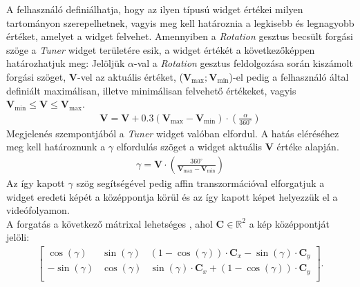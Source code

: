 A felhasználó definiálhatja, hogy az ilyen típusú widget értékei milyen tartományon szerepelhetnek, vagyis meg kell határoznia a legkisebb és legnagyobb értéket, amelyet a widget felvehet. Amennyiben a \textit{Rotation} gesztus becsült forgási szöge a \textit{Tuner} widget területére esik, a widget értékét a következőképpen határozhatjuk meg:
Jelöljük $\alpha$-val a \textit{Rotation} gesztus feldolgozása során kiszámolt forgási szöget, $\boldsymbol V$-vel az aktuális értéket, ($\boldsymbol V_{\max}; \boldsymbol V_{\min}$)-el pedig a felhasználó által definiált maximálisan, illetve minimálisan felvehető értékeket, vagyis $\boldsymbol V_{\min} \leq \boldsymbol V \leq \boldsymbol V_{\max}$.
\begin{align*}
	\boldsymbol V = \boldsymbol V + 0.3\left(\boldsymbol V_{\max} - \boldsymbol V_{\min}\right) \cdot \left( \frac{\alpha}{360^\circ}\right)
\end{align*}
Megjelenés szempontjából a \textit{Tuner} widget valóban elfordul. A hatás eléréséhez meg kell határoznunk a $\gamma$ elfordulás szöget a widget aktuális $\boldsymbol V$ értéke alapján.
\begin{align*}
	\gamma = \boldsymbol V \cdot \left(\frac{360^\circ}{\boldsymbol V_{\max} - \boldsymbol V_{\min}}\right)
\end{align*}
Az így kapott $\gamma$ szög segítségével pedig affin transzormációval elforgatjuk a widget eredeti képét a középpontja körül és az így kapott képet helyezzük el a videófolyamon.\\
A forgatás a következő mátrixal lehetséges \cite{bradski2008learning}, ahol $\boldsymbol C \in \mathbb{R}^2$ a kép középpontját jelöli:
\begin{align*}
	\begin{bmatrix}
		\cos(\gamma) & \sin(\gamma) & (1-\cos(\gamma))\cdot \boldsymbol C_x-\sin(\gamma)\cdot \boldsymbol C_y\\
		-\sin(\gamma) & \cos(\gamma) & \sin(\gamma)\cdot \boldsymbol C_x+(1-\cos(\gamma))\cdot \boldsymbol C_y\\
	\end{bmatrix}.
\end{align*}
